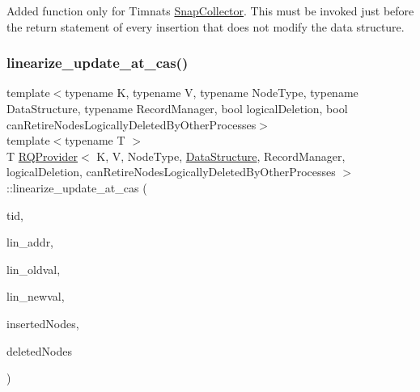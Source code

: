 Added function only for Timnat\textquotesingle{}s \hyperlink{classSnapCollector}{Snap\+Collector}. This must be invoked just before the return statement of every insertion that does not modify the data structure. \mbox{\label{classRQProvider_a234b9ee35646cdff3d751df16424a57e}} 
\subsubsection{\texorpdfstring{linearize\+\_\+update\+\_\+at\+\_\+cas()}{linearize\_update\_at\_cas()}\hspace{0.1cm}{\footnotesize\ttfamily [1/5]}}
{\footnotesize\ttfamily template$<$typename K, typename V, typename Node\+Type, typename Data\+Structure, typename Record\+Manager, bool logical\+Deletion, bool can\+Retire\+Nodes\+Logically\+Deleted\+By\+Other\+Processes$>$ \\
template$<$typename T $>$ \\
T \hyperlink{classRQProvider}{R\+Q\+Provider}$<$ K, V, Node\+Type, \hyperlink{classDataStructure}{Data\+Structure}, Record\+Manager, logical\+Deletion, can\+Retire\+Nodes\+Logically\+Deleted\+By\+Other\+Processes $>$\+::linearize\+\_\+update\+\_\+at\+\_\+cas (\begin{DoxyParamCaption}\item[{const int}]{tid,  }\item[{T volatile $\ast$const}]{lin\+\_\+addr,  }\item[{const T \&}]{lin\+\_\+oldval,  }\item[{const T \&}]{lin\+\_\+newval,  }\item[{Node\+Type $\ast$const $\ast$const}]{inserted\+Nodes,  }\item[{Node\+Type $\ast$const $\ast$const}]{deleted\+Nodes }\end{DoxyParamCaption})\hspace{0.3cm}{\ttfamily [inline]}}

\mbox{\label{classRQProvider_a234b9ee35646cdff3d751df16424a57e}} 
